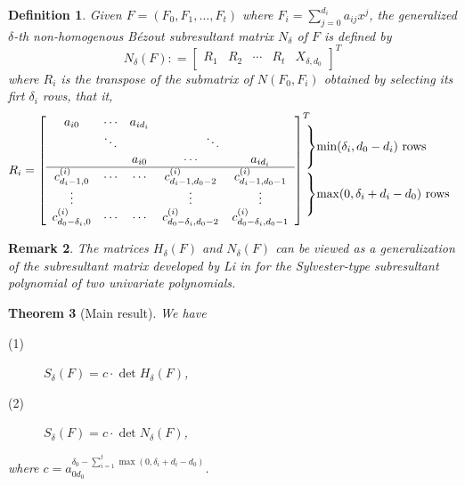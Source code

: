 \documentclass{article}
\newtheorem{theorem}{Theorem}
\newtheorem{definition}[theorem]{Definition}
\newtheorem{remark}[theorem]{Remark}
\begin{document}
\begin{definition}\label{def:nh}
Given $F=(F_0,F_1,\ldots,F_t)$ where $F_i=\sum_{j=0}^{d_i}a_{ij}x^j$,  the generalized $\delta$-th non-homogenous B\'ezout subresultant matrix $N_\delta$  of $F$ is defined by
$$N_\delta(F): = {\left[ {\begin{array}{*{20}{l}}
{{R_1}}&{{R_2}}& \cdots &{{R_t}}&{{X_{\delta ,{d_0}}}}
\end{array}} \right]^T}$$
where $R_i$ is the transpose of the submatrix of $N(F_0,F_i)$ obtained by selecting its firt $\delta_i$ rows, that it,
$${R_i} =
\setlength{\arraycolsep}{5pt}{\left[ {\begin{array}{*{20}{c}}
{{a_{i0}}}& \cdots &{{a_{i{d_i}}}}&{}&{}\\
{}& \ddots &{}& ~~~~~~~~~~~\ddots &{}\\
{}&{}&{{a_{i0}}}& \cdots &{{a_{i{d_i}}}}\\
\hline
{c_{d_i-1,0}^{(i)}}& \cdots&\cdots &{c_{d_i-1,{d_0} - 2}^{(i)}}&{c_{d_i-1,{d_0} - 1}^{(i)}}\\
 \vdots & & &\vdots & \vdots \\
{c_{d_{0}-\delta_i,0}^{(i)}}& \cdots&\cdots &{c_{d_{0}-\delta_i,{d_0} - 2}^{(i)}}&{c_{d_{0}-\delta_i,{d_0} - 1}^{(i)}}
\end{array}} \right]^T}\hspace{-2em}\begin{array}{*{20}{l}}
{\left. {\begin{array}{*{20}{c}}
{}\\
{}\\
{}
\end{array}} \right\}}{\min ({\delta _i},{d_0} - {d_i})\text{~rows}}\\[15pt]
{\left. {\begin{array}{*{20}{c}}
{}\\
{}\\
{}
\end{array}} \right\}}{\max (0,{\delta _i} + {d_i} - {d_0})\text{~rows}}
\end{array}$$
\end{definition}

\begin{remark}
The matrices $H_\delta(F)$ and $N_\delta(F)$ can be viewed as a generalization of the subresultant matrix developed by Li in \cite{li2006} for the Sylvester-type subresultant polynomial of two univariate polynomials.
\end{remark}

\begin{theorem}[Main result]\label{the:bez}
We have
\begin{description}
\item[(1)] ${S_\delta }(F) = c \cdot \det H_\delta (F)$,

\item[(2)] ${S_\delta }(F) =c \cdot \det N_\delta (F)$,
\end{description}
where
$c= a_{{0d_0}}^{\delta_0-\sum_{i = 1}^t {\max (0,{\delta _i} + {d_i} - {d_0})} }$.
\end{theorem}
\end{document}
